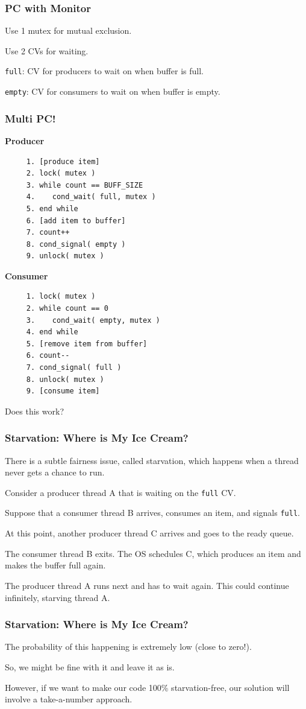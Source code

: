 \begin{frame}
	\frametitle{PC with Monitor}

	Use 1 mutex for mutual exclusion.

	Use 2 CVs for waiting.

	\texttt{full}: CV for producers to wait on when buffer is full.

	\texttt{empty}: CV for consumers to wait on when buffer is empty.
\end{frame}


\begin{frame}[fragile]
	\frametitle{Multi PC!}

	\begin{multicols}{2}
		\small
		\textbf{Producer}
		\begin{verbatim}
	 1. [produce item]
	 2. lock( mutex )
	 3. while count == BUFF_SIZE
	 4.    cond_wait( full, mutex )
	 5. end while
	 6. [add item to buffer]
	 7. count++
	 8. cond_signal( empty )
	 9. unlock( mutex )
		\end{verbatim}
		\columnbreak
		\textbf{Consumer}\vspace{-2em}
		\begin{verbatim}
	 1. lock( mutex )
	 2. while count == 0
	 3.    cond_wait( empty, mutex )
	 4. end while
	 5. [remove item from buffer]
	 6. count--
	 7. cond_signal( full )
	 8. unlock( mutex )
	 9. [consume item]
		\end{verbatim}
	\end{multicols}
	\vspace{-2em}

	Does this work?

\end{frame}


\begin{frame}
	\frametitle{Starvation: Where is My Ice Cream?}

	There is a subtle fairness issue, called \alert{starvation}, which happens when a thread never gets a chance to run.

	Consider a producer thread A that is waiting on the \texttt{full} CV.

	Suppose that a consumer thread B arrives, consumes an item, and signals \texttt{full}.

	At this point, another producer thread C arrives and goes to the ready queue.

	The consumer thread B exits.
	The OS schedules C, which produces an item and makes the buffer full again.

	The producer thread A runs next and has to wait again.
	This could continue \alert{infinitely}, starving thread A.
\end{frame}
\begin{frame}
	\frametitle{Starvation: Where is My Ice Cream?}

	The probability of this happening is extremely low (close to zero!).

	So, we might be fine with it and leave it as is.

	However, if we want to make our code 100\% starvation-free, our solution will involve a \alert{take-a-number} approach.
\end{frame}

